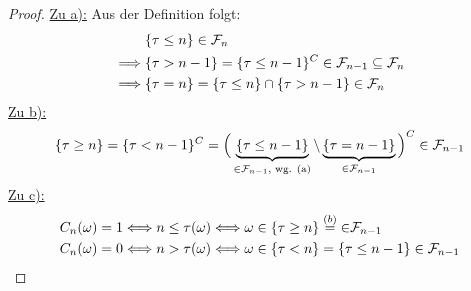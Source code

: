 \documentclass[12pt,a4paper]{article}
\begin{document}
\begin{proof}
\underline{Zu a):} Aus der Definition folgt:
\begin{align*}
	&\{\tau \leq n\} \in \mathcal{F}_n \\
	\implies & \{\tau > n-1\} = \{\tau \leq n-1\}^C \in \mathcal{F}_{n-1} \subseteq \mathcal{F}_n \\
	\implies & \{\tau = n\} = \{\tau \leq n\} \cap \{\tau > n-1\} \in \mathcal{F}_n
	\end{align*}
\underline{Zu b):}\\
\begin{align*}
	\{\tau \geq n \} =\lbrace\tau <n-1\rbrace^C= \Big(\underbrace{\{\tau \leq n-1 \}}_{\in\mathcal{F}_{n-1}\text{, wg. (a)}} \setminus \underbrace{\{\tau = n-1 \}}_{\in\mathcal{F}_{n-1}} \Big)^C \in \mathcal{F}_{n-1}
\end{align*}
\underline{Zu c):}\\
\begin{align*}
C_n(\omega)&=1\Longleftrightarrow n\leq\tau(\omega)\Longleftrightarrow
\omega\in\lbrace\tau\geq n\rbrace\stackrel{(b)}{=}{\in}\mathcal{F}_{n-1}\\
C_n(\omega)&=0\Longleftrightarrow
n>\tau(\omega)\Longleftrightarrow
\omega\in\lbrace\tau<n\rbrace=\lbrace\tau\leq n-1\rbrace\in\mathcal{F}_{n-1}
\end{align*}








\end{proof}
\end{document}
